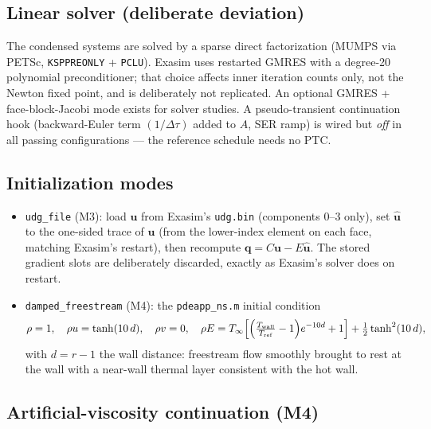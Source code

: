 \documentclass[11pt]{article}
\newcommand{\bu}{\mathbf{u}}
\newcommand{\bq}{\mathbf{q}}
\newcommand{\buh}{\widehat{\mathbf{u}}}
\newcommand{\code}[1]{\texttt{#1}}
\begin{document}
\subsection{Linear solver (deliberate deviation)}

The condensed systems are solved by a sparse direct factorization (MUMPS via
PETSc, \code{KSPPREONLY} + \code{PCLU}). Exasim uses restarted GMRES with a
degree-20 polynomial preconditioner; that choice affects inner iteration
counts only, not the Newton fixed point, and is deliberately not replicated.
An optional GMRES + face-block-Jacobi mode exists for solver studies. A
pseudo-transient continuation hook (backward-Euler term $(1/\Delta\tau)$
added to $A$, SER ramp) is wired but \emph{off} in all passing
configurations --- the reference schedule needs no PTC.

\subsection{Initialization modes}

\begin{itemize}
\item \code{udg\_file} (M3): load $\bu$ from Exasim's \code{udg.bin}
(components 0--3 only), set $\buh$ to the one-sided trace of $\bu$ (from the
lower-index element on each face, matching Exasim's restart), then recompute
$\bq = C\bu - E\buh$. The stored gradient slots are deliberately discarded,
exactly as Exasim's solver does on restart.
\item \code{damped\_freestream} (M4): the \code{pdeapp\_ns.m} initial
condition
\begin{equation}
\rho = 1,\quad
\rho u = \tanh(10\,d),\quad
\rho v = 0,\quad
\rho E = T_\infty\!\left[\Bigl(\tfrac{T_{\mathrm{wall}}}{T_{\mathrm{ref}}}
- 1\Bigr)e^{-10 d} + 1\right] + \tfrac12\tanh^2(10\,d),
\end{equation}
with $d = r - 1$ the wall distance: freestream flow smoothly brought to rest
at the wall with a near-wall thermal layer consistent with the hot wall.
\end{itemize}

\subsection{Artificial-viscosity continuation (M4)}
\label{sec:continuation}
\end{document}
